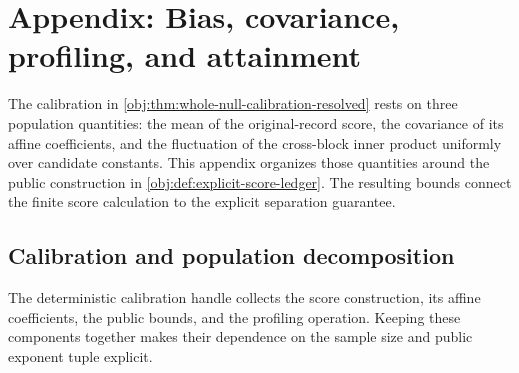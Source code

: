 \section{Appendix: Bias, covariance, profiling, and attainment}

The calibration in \cref{obj:thm:whole-null-calibration-resolved} rests on three population quantities: the mean of the original-record score, the covariance of its affine coefficients, and the fluctuation of the cross-block inner product uniformly over candidate constants. This appendix organizes those quantities around the public construction in \cref{obj:def:explicit-score-ledger}. The resulting bounds connect the finite score calculation to the explicit separation guarantee.

\subsection{Calibration and population decomposition}

The deterministic calibration handle collects the score construction, its affine coefficients, the public bounds, and the profiling operation. Keeping these components together makes their dependence on the sample size and public exponent tuple explicit.


